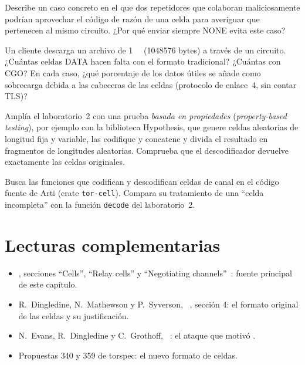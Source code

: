 \begin{esercizio}[2]\label{es:08-destroy}
Describe un caso concreto en el que dos repetidores que colaboran maliciosamente podrían aprovechar el código de razón de una celda  para averiguar que pertenecen al mismo circuito. ¿Por qué enviar siempre NONE evita este caso?
\end{esercizio}

\begin{esercizio}[2]\label{es:08-efficienza}
Un cliente descarga un archivo de \SI{1}{\mebi\byte} (\num{1048576} bytes) a través de un circuito. ¿Cuántas celdas DATA hacen falta con el formato tradicional? ¿Cuántas con CGO? En cada caso, ¿qué porcentaje de los datos útiles se añade como sobrecarga debida a las cabeceras de las celdas (protocolo de enlace~4, sin contar TLS)?
\end{esercizio}

\begin{esercizio}[3]\label{es:08-lab-fuzz}
Amplía el laboratorio~2 con una prueba \emph{basada en propiedades} (\emph{property-based testing}), por ejemplo con la biblioteca Hypothesis, que genere celdas aleatorias de longitud fija y variable, las codifique y concatene y divida el resultado en fragmentos de longitudes aleatorias. Comprueba que el descodificador devuelve exactamente las celdas originales.
\end{esercizio}

\begin{esercizio}[3]\label{es:08-arti}
Busca las funciones que codifican y descodifican celdas de canal en el código fuente de Arti (crate \texttt{tor-cell}). Compara su tratamiento de una \enquote{celda incompleta} con la función \texttt{decode} del laboratorio~2.
\end{esercizio}

\section*{Lecturas complementarias}
\begin{itemize}
  \item {}, secciones \enquote{Cells}, \enquote{Relay cells} y \enquote{Negotiating channels}~\cite{torspec}: fuente principal de este capítulo.
  \item R.~Dingledine, N.~Mathewson y P.~Syverson, ~\cite{dingledine2004tor}, sección 4: el formato original de las celdas y su justificación.
  \item N.~Evans, R.~Dingledine y C.~Grothoff, ~\cite{evans2009congestion}: el ataque que motivó .
  \item Propuestas 340 y 359 de torspec: el nuevo formato de celdas.
\end{itemize}

